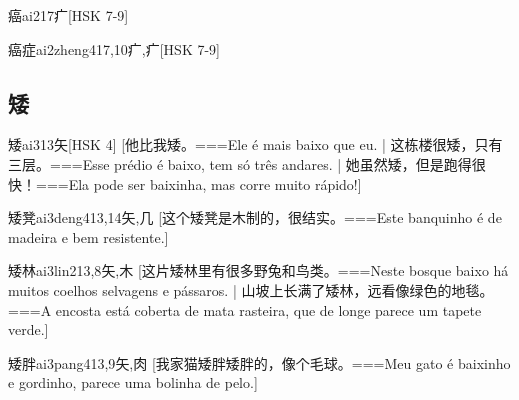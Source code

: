 \begin{EntryWithPhonetic}{癌}{ai2}{17}{⽧}[HSK 7-9]
\end{EntryWithPhonetic}

\begin{EntryWithPhonetic}{癌症}{ai2zheng4}{17,10}{⽧,⽧}[HSK 7-9]
\end{EntryWithPhonetic}

\subsection*{矮}

\begin{EntryWithPhonetic}{矮}{ai3}{13}{⽮}[HSK 4]
  [他比我矮。===Ele é mais baixo que eu. | 这栋楼很矮，只有三层。===Esse prédio é baixo, tem só três andares. | 她虽然矮，但是跑得很快！===Ela pode ser baixinha, mas corre muito rápido!]
\end{EntryWithPhonetic}

\begin{EntryWithPhonetic}{矮凳}{ai3deng4}{13,14}{⽮,⼏}
  [这个矮凳是木制的，很结实。===Este banquinho é de madeira e bem resistente.]
\end{EntryWithPhonetic}

\begin{EntryWithPhonetic}{矮林}{ai3lin2}{13,8}{⽮,⽊}
  [这片矮林里有很多野兔和鸟类。===Neste bosque baixo há muitos coelhos selvagens e pássaros. | 山坡上长满了矮林，远看像绿色的地毯。===A encosta está coberta de mata rasteira, que de longe parece um tapete verde.]
\end{EntryWithPhonetic}

\begin{EntryWithPhonetic}{矮胖}{ai3pang4}{13,9}{⽮,⾁}
  [我家猫矮胖矮胖的，像个毛球。===Meu gato é baixinho e gordinho, parece uma bolinha de pelo.]
\end{EntryWithPhonetic}

